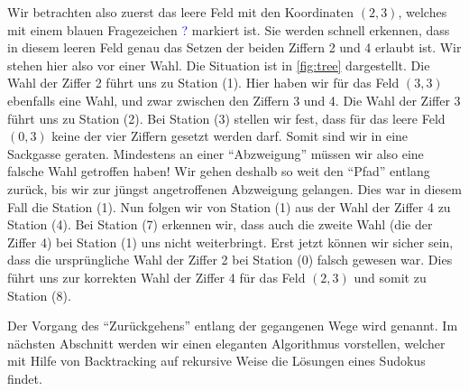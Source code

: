 Wir betrachten also zuerst das leere Feld mit den Koordinaten $(2,3)$, welches mit einem blauen Fragezeichen \textcolor{Blue}{?} markiert ist. Sie werden schnell erkennen, dass in diesem leeren Feld genau das Setzen der beiden Ziffern 2 und 4 erlaubt ist. Wir stehen hier also vor einer Wahl. Die Situation ist in \cref{fig:tree} dargestellt. Die Wahl der Ziffer 2 führt uns zu Station (1). Hier haben wir für das Feld $(3,3)$ ebenfalls eine Wahl, und zwar zwischen den Ziffern 3 und 4. Die Wahl der Ziffer 3 führt uns zu Station (2). Bei Station (3) stellen wir fest, dass für das leere Feld $(0,3)$ keine der vier Ziffern gesetzt werden darf. Somit sind wir in eine Sackgasse geraten. Mindestens an einer \enquote{Abzweigung} müssen wir also eine falsche Wahl getroffen haben! Wir gehen deshalb so weit den \enquote{Pfad} entlang zurück, bis wir zur jüngst angetroffenen Abzweigung gelangen. Dies war in diesem Fall die Station (1). Nun folgen wir von Station (1) aus der Wahl der Ziffer 4 zu Station (4). Bei Station (7) erkennen wir, dass auch die zweite Wahl (die der Ziffer 4) bei Station (1) uns nicht weiterbringt. Erst jetzt können wir sicher sein, dass die ursprüngliche Wahl der Ziffer 2 bei Station (0) falsch gewesen war. Dies führt uns zur korrekten Wahl der Ziffer 4 für das Feld $(2,3)$ und somit zu Station (8).

Der Vorgang des \enquote{Zurückgehens} entlang der gegangenen Wege wird  genannt. Im nächsten Abschnitt werden wir einen eleganten Algorithmus vorstellen, welcher mit Hilfe von Backtracking auf rekursive Weise die Lösungen eines Sudokus findet.


